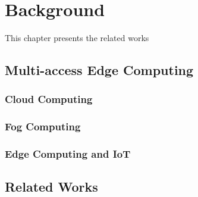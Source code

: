 \chapter{Background}

This chapter presents the related works 


\section{Multi-access Edge Computing}
\subsection{Cloud Computing}
\subsection{Fog Computing}
\subsection{Edge Computing and IoT}

\section{Related Works}
